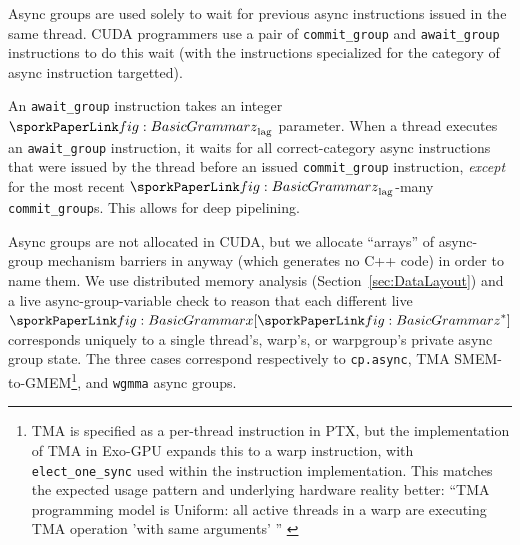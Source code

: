
Async groups are used solely to wait for previous async instructions issued in the same thread.
CUDA programmers use a pair of \texttt{commit\_group} and \texttt{await\_group}
instructions to do this wait
(with the instructions specialized for the category of async instruction targetted).

An \texttt{await\_group} instruction takes an integer $\sporkz_\mathrm{lag}$ parameter.
When a thread executes an \texttt{await\_group} instruction,
it waits for all correct-category async instructions that were issued by the thread
before an issued \texttt{commit\_group} instruction,
\emph{except} for the most recent $\sporkz_\mathrm{lag}$-many \texttt{commit\_group}s.
This allows for deep pipelining.

Async groups are not allocated in CUDA,
but we allocate ``arrays'' of async-group mechanism barriers in \sporkName{} anyway
(which generates no C++ code) in order to name them.
We use distributed memory analysis (Section~\ref{sec:DataLayout})
and a live async-group-variable check to reason that
each different live $\sporkx[\sporkz^*]$ corresponds uniquely
to a single thread's, warp's, or warpgroup's private async group state.
The three cases correspond respectively to \texttt{cp.async},
TMA SMEM-to-GMEM\footnote{
TMA is specified as a per-thread instruction in PTX, but the implementation of TMA in Exo-GPU expands this to a warp instruction, with \texttt{elect\_one\_sync} used within the instruction implementation.
This matches the expected usage pattern and underlying hardware reality better: ``TMA programming model is Uniform: all active threads in a warp are executing TMA operation 'with same arguments' ''
\cite{TerentyevGTC24}
}, and \texttt{wgmma} async groups.

